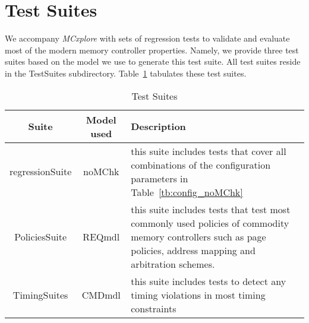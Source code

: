 
\section{Test Suites} 
We accompany \textit{MCxplore} with sets of regression tests to validate and evaluate most of the modern memory controller properties. 
Namely, we provide three test suites based on the model we use to generate this test suite. All test suites reside in the TestSuites subdirectory. 
Table~\ref{tb:suites} tabulates these test suites.

\begin{table}[h]
\caption{Test Suites\label{tb:suites}}
\begin{tabular}{|c|c|p{11cm}|}
\hline
Suite & Model used & Description\\
\hline
regressionSuite & noMChk & this suite includes tests that cover all combinations of the configuration parameters in Table~\ref{tb:config_noMChk}\\
\hline 

PoliciesSuite & REQmdl & this suite includes tests that test most commonly used policies of commodity memory controllers such as page policies, address mapping and arbitration schemes.\\
\hline

TimingSuites & CMDmdl & this suite includes tests to detect any timing violations in most timing constraints\\
\hline
\end{tabular}
\end{table}
